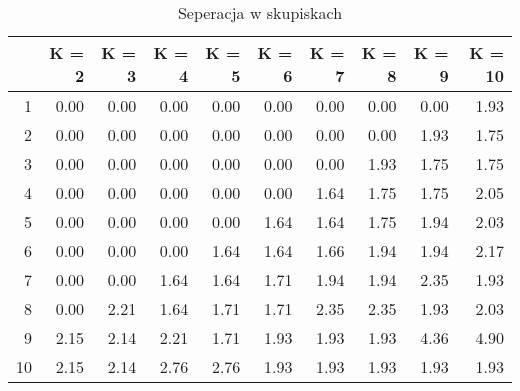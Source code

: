 \begin{table}[ht]
\centering
\begin{tabular}{rrrrrrrrrr}
  \hline
 & K = 2 & K = 3 & K = 4 & K = 5 & K = 6 & K = 7 & K = 8 & K = 9 & K = 10 \\ 
  \hline
1 & 0.00 & 0.00 & 0.00 & 0.00 & 0.00 & 0.00 & 0.00 & 0.00 & 1.93 \\ 
  2 & 0.00 & 0.00 & 0.00 & 0.00 & 0.00 & 0.00 & 0.00 & 1.93 & 1.75 \\ 
  3 & 0.00 & 0.00 & 0.00 & 0.00 & 0.00 & 0.00 & 1.93 & 1.75 & 1.75 \\ 
  4 & 0.00 & 0.00 & 0.00 & 0.00 & 0.00 & 1.64 & 1.75 & 1.75 & 2.05 \\ 
  5 & 0.00 & 0.00 & 0.00 & 0.00 & 1.64 & 1.64 & 1.75 & 1.94 & 2.03 \\ 
  6 & 0.00 & 0.00 & 0.00 & 1.64 & 1.64 & 1.66 & 1.94 & 1.94 & 2.17 \\ 
  7 & 0.00 & 0.00 & 1.64 & 1.64 & 1.71 & 1.94 & 1.94 & 2.35 & 1.93 \\ 
  8 & 0.00 & 2.21 & 1.64 & 1.71 & 1.71 & 2.35 & 2.35 & 1.93 & 2.03 \\ 
  9 & 2.15 & 2.14 & 2.21 & 1.71 & 1.93 & 1.93 & 1.93 & 4.36 & 4.90 \\ 
  10 & 2.15 & 2.14 & 2.76 & 2.76 & 1.93 & 1.93 & 1.93 & 1.93 & 1.93 \\ 
   \hline
\end{tabular}
\caption{Seperacja w skupiskach} 
\end{table}
